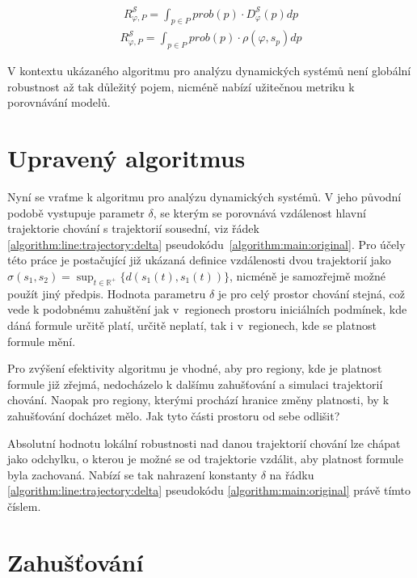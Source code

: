 \begin{align}
R_{\varphi, P}^\mathcal{S} = {\displaystyle\int_{p \in P}}prob(p) \cdot D_\varphi^\mathcal{S}(p)dp\label{eq:global:robustness:general}
\end{align}
\begin{align}
R_{\varphi, P}^\mathcal{S} = {\displaystyle\int_{p \in P}}prob(p) \cdot \rho(\varphi, s_p)dp\label{eq:global:robustness:concrete}
\end{align}

V kontextu ukázaného algoritmu pro analýzu dynamických systémů není globální robustnost až tak
důležitý pojem, nicméně nabízí užitečnou metriku k porovnávání modelů.

\section{Upravený algoritmus}\label{section:algorithm:updated}

Nyní se vraťme k algoritmu pro analýzu dynamických systémů. V jeho původní podobě
vystupuje parametr $\delta$, se kterým se porovnává vzdálenost hlavní trajektorie chování
s trajektorií sousední, viz řádek \ref{algorithm:line:trajectory:delta}
pseudokódu~\ref{algorithm:main:original}. Pro účely této práce je postačující již ukázaná
definice vzdálenosti dvou trajektorií jako $\sigma(s_1, s_2) = {\displaystyle \sup_{t \in \mathbb{R}^{+}}} \{d(s_1(t), s_1(t))\}$,
nicméně je samozřejmě mož\-né použít jiný předpis. Hodnota parametru $\delta$ je pro celý prostor
chování stejná, což vede k podobnému zahuštění jak v~regionech prostoru iniciálních pod\-mí\-nek,
kde dáná formule určitě platí, určitě neplatí, tak i v~regionech, kde se platnost formule mění.

Pro zvýšení efektivity algoritmu je vhodné, aby pro regiony, kde je platnost formule již zřejmá,
nedocházelo k dalšímu zahušťování a simulaci trajektorií chování. Naopak pro regiony, kterými prochází
hranice změny platnosti, by k zahušťování docházet mělo. Jak tyto části prostoru od sebe odlišit?

Absolutní hodnotu lokální robustnosti nad danou trajektorií chování lze chápat
jako odchylku, o kterou je možné se od trajektorie vzdálit, aby platnost
formule byla zachovaná. Nabízí se tak nahrazení konstanty $\delta$ na řádku \ref{algorithm:line:trajectory:delta} pseudokódu \ref{algorithm:main:original}
právě tímto číslem.

\section{Zahušťování}


